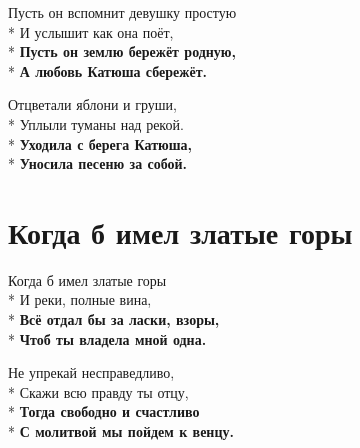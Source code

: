 \medskip

\begin{minipage}{\linewidth}
Пусть он вспомнит девушку простую\\*
И услышит как она поёт,\\*
\textbf{Пусть он землю бережёт родную,}\\*
\textbf{А любовь Катюша сбережёт.}\\
\end{minipage}\par\medskip\nobreak

\medskip

\begin{minipage}{\linewidth}
Отцветали яблони и груши,\\*
Уплыли туманы над рекой.\\*
\textbf{Уходила с берега Катюша,}\\*
\textbf{Уносила песеню за собой.}\\
\end{minipage}

\vspace{\fill}\newpage

\section{Когда б имел златые горы}
\label{song:Когда_б_имел_златые_горы}

\medskip

\begin{minipage}{\linewidth}
Когда б имел златые горы\\*
И реки, полные вина,\\*
\textbf{Всё отдал бы за ласки, взоры,}\\*
\textbf{Чтоб ты владела мной одна.}\\
\end{minipage}\par\medskip\nobreak

\medskip

\begin{minipage}{\linewidth}
Не упрекай несправедливо,\\*
Скажи всю правду ты отцу,\\*
\textbf{Тогда свободно и счастливо}\\*
\textbf{С молитвой мы пойдем к венцу.}\\
\end{minipage}\par\medskip\nobreak

